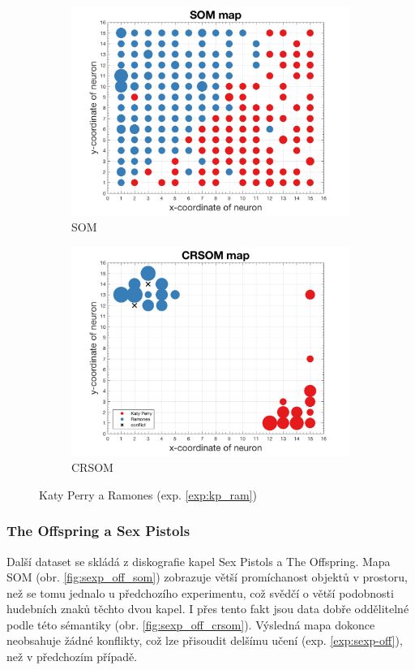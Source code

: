 \documentclass[thesis=M,czech]{FITthesis}[2012/06/26]
\begin{document}
\begin{figure}
\centering
\begin{subfigure}{.5\textwidth}
  \centering
  \includegraphics[width=.99\linewidth]{exp_kp_ram_som.png}
  \caption{SOM}
  \label{fig:kp_ram_som}
\end{subfigure}%
\begin{subfigure}{.5\textwidth}
  \centering
  \includegraphics[width=.99\linewidth]{exp_kp_ram_crsom.png}
  \caption{CRSOM}
  \label{fig:kp_ram_crsom}
\end{subfigure}
\caption{Katy Perry a Ramones (exp. \ref{exp:kp_ram})}
\label{fig:kp_ram_res}
\end{figure}


\subsubsection*{The Offspring a Sex Pistols}
Další dataset se skládá z diskografie kapel Sex Pistols a The Offspring. Mapa SOM (obr. \ref{fig:sexp_off_som}) zobrazuje větší promíchanost objektů v prostoru, než se tomu jednalo u  předchozího experimentu, což svědčí o větší podobnosti hudebních znaků těchto dvou kapel. I přes tento fakt jsou data dobře oddělitelné podle této sémantiky (obr. \ref{fig:sexp_off_crsom}). Výsledná mapa dokonce neobsahuje žádné konflikty, což lze přisoudit delšímu učení (exp. \ref{exp:sexp-off}), než v předchozím případě.
\end{document}
